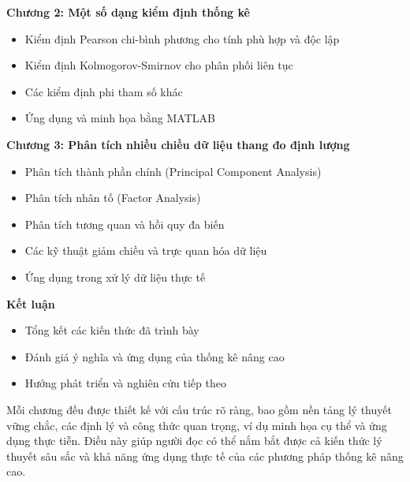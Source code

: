 \textbf{Chương 2: Một số dạng kiểm định thống kê}
\begin{itemize}
    \item Kiểm định Pearson chi-bình phương cho tính phù hợp và độc lập
    \item Kiểm định Kolmogorov-Smirnov cho phân phối liên tục
    \item Các kiểm định phi tham số khác
    \item Ứng dụng và minh họa bằng MATLAB
\end{itemize}

\textbf{Chương 3: Phân tích nhiều chiều dữ liệu thang đo định lượng}
\begin{itemize}
    \item Phân tích thành phần chính (Principal Component Analysis)
    \item Phân tích nhân tố (Factor Analysis)
    \item Phân tích tương quan và hồi quy đa biến
    \item Các kỹ thuật giảm chiều và trực quan hóa dữ liệu
    \item Ứng dụng trong xử lý dữ liệu thực tế
\end{itemize}

\textbf{Kết luận}
\begin{itemize}
    \item Tổng kết các kiến thức đã trình bày
    \item Đánh giá ý nghĩa và ứng dụng của thống kê nâng cao
    \item Hướng phát triển và nghiên cứu tiếp theo
\end{itemize}

Mỗi chương đều được thiết kế với cấu trúc rõ ràng, bao gồm nền tảng lý thuyết vững chắc, các định lý và công thức quan trọng, ví dụ minh họa cụ thể và ứng dụng thực tiễn. Điều này giúp người đọc có thể nắm bắt được cả kiến thức lý thuyết sâu sắc và khả năng ứng dụng thực tế của các phương pháp thống kê nâng cao.
